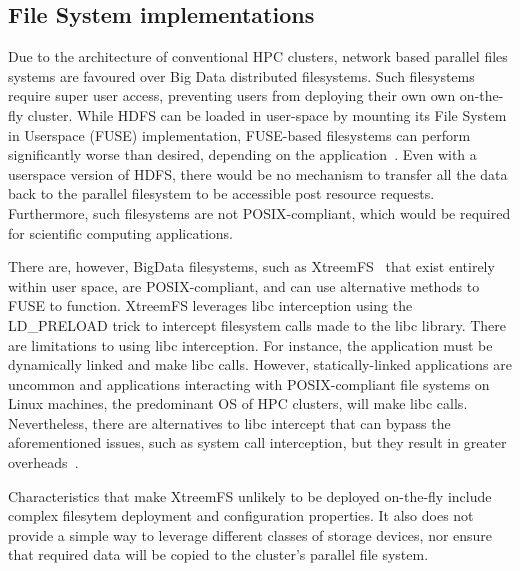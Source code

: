 \subsection{File System implementations}
      Due to the architecture of conventional HPC clusters, network based
      parallel files systems are favoured over Big Data distributed filesystems.
      Such filesystems require super user access, preventing users from
      deploying their own own on-the-fly cluster. While HDFS can be loaded in
      user-space by mounting its File System in Userspace (FUSE) implementation,
      FUSE-based filesystems can perform significantly worse than desired,
      depending on the application~\cite{tofuse}. Even with a userspace version
      of HDFS, there would be no mechanism to transfer all the data back to the
      parallel filesystem to be accessible post resource requests. Furthermore,
      such filesystems are not POSIX-compliant, which would be required for
      scientific computing applications.
      
      There are, however, BigData filesystems, such as XtreemFS~\cite{xtreemfs}
      that exist entirely within user space, are POSIX-compliant, and can use
      alternative methods to FUSE to function. XtreemFS leverages libc
      interception using the LD\_PRELOAD trick to intercept filesystem calls
      made to the libc library. There are limitations to using libc
      interception. For instance, the application must be dynamically linked and
      make libc calls. However, statically-linked applications are uncommon and
      applications interacting with POSIX-compliant file systems on Linux
      machines, the predominant OS of HPC clusters, will make libc calls.
      Nevertheless, there are alternatives to libc intercept that can bypass the
      aforementioned issues, such as system call interception, but they result
      in greater overheads~\cite{quinson}.

      Characteristics that make XtreemFS unlikely to be deployed on-the-fly
      include complex filesytem deployment and configuration properties. It also
      does not provide a simple way to leverage different classes of storage
      devices, nor ensure that required data will be copied to the cluster's
      parallel file system.


